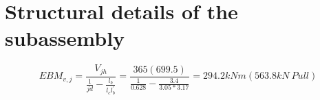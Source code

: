 
\section{Structural details of the subassembly}
\label{hier:details}

\begin{equation}
\label{eq:EBMjoint}
EBM_{v,j} = \frac{V_{jh}}{\frac{1}{jd}-\frac{l_{b}}{l_{c}l_{b}^{'}}} = \frac{365(699.5)}{\frac{1}{0.628}-\frac{3.4}{3.05*3.17}} = 294.2 kNm (563.8kN \ Pull)
\end{equation}

